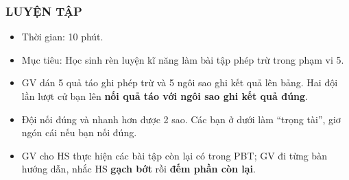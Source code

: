 \documentclass[../main.tex]{subfiles}
\begin{document}
\subsubsection{LUYỆN TẬP}
\begin{hd}
    \begin{itemize}
        \item Thời gian: 10 phút.
        \item Mục tiêu: Học sinh rèn luyện kĩ năng làm bài tập phép trừ trong phạm vi 5.
    \end{itemize}
\end{hd}
\begin{itemize}
    \item[-] GV dán 5 quả táo ghi phép trừ và 5 ngôi sao ghi kết quả lên bảng. Hai đội lần lượt cử bạn lên \textbf{nối quả táo với ngôi sao ghi kết quả đúng}.
    \item[-] Đội nối đúng và nhanh hơn được 2 sao. Các bạn ở dưới làm “trọng tài”, giơ ngón cái nếu bạn nối đúng.
\end{itemize}
\begin{itemize}
    \item[-] GV cho HS thực hiện các bài tập còn lại có trong PBT; GV đi từng bàn hướng dẫn, nhắc HS \textbf{gạch bớt} rồi \textbf{đếm phần còn lại}.
\end{itemize}

\end{document}
